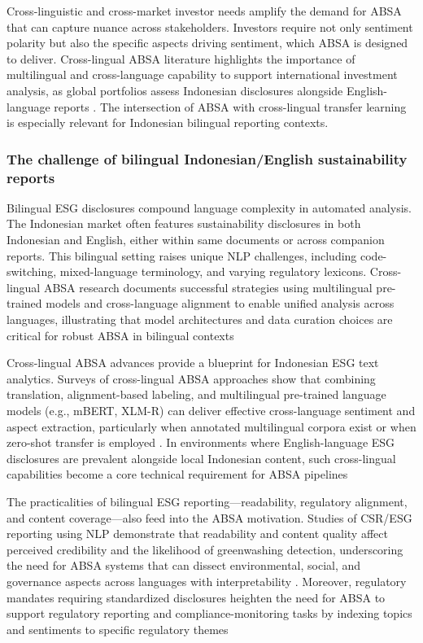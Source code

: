 Cross-linguistic and cross-market investor needs amplify the demand for ABSA that can capture nuance across stakeholders. Investors require not only sentiment polarity but also the specific aspects driving sentiment, which ABSA is designed to deliver. Cross-lingual ABSA literature highlights the importance of multilingual and cross-language capability to support international investment analysis, as global portfolios assess Indonesian disclosures alongside English-language reports \cite{10.1016/j.inffus.2025.103073,10.1111/eufm.12509,10.48550/arxiv.2511.00024}. The intersection of ABSA with cross-lingual transfer learning is especially relevant for Indonesian bilingual reporting contexts.

\subsubsection{The challenge of bilingual Indonesian/English sustainability reports}
Bilingual ESG disclosures compound language complexity in automated analysis. The Indonesian market often features sustainability disclosures in both Indonesian and English, either within same documents or across companion reports. This bilingual setting raises unique NLP challenges, including code-switching, mixed-language terminology, and varying regulatory lexicons. Cross-lingual ABSA research documents successful strategies using multilingual pre-trained models and cross-language alignment to enable unified analysis across languages, illustrating that model architectures and data curation choices are critical for robust ABSA in bilingual contexts \cite{10.1016/j.inffus.2025.103073,10.1111/eufm.12509,10.48550/arxiv.2511.00024}

Cross-lingual ABSA advances provide a blueprint for Indonesian ESG text analytics. Surveys of cross-lingual ABSA approaches show that combining translation, alignment-based labeling, and multilingual pre-trained language models (e.g., mBERT, XLM-R) can deliver effective cross-language sentiment and aspect extraction, particularly when annotated multilingual corpora exist or when zero-shot transfer is employed \cite{10.1016/j.inffus.2025.103073}. In environments where English-language ESG disclosures are prevalent alongside local Indonesian content, such cross-lingual capabilities become a core technical requirement for ABSA pipelines \cite{10.1016/j.inffus.2025.103073,10.1111/eufm.12509}

The practicalities of bilingual ESG reporting—readability, regulatory alignment, and content coverage—also feed into the ABSA motivation. Studies of CSR/ESG reporting using NLP demonstrate that readability and content quality affect perceived credibility and the likelihood of greenwashing detection, underscoring the need for ABSA systems that can dissect environmental, social, and governance aspects across languages with interpretability \cite{10.1111/eufm.12509}. Moreover, regulatory mandates requiring standardized disclosures heighten the need for ABSA to support regulatory reporting and compliance-monitoring tasks by indexing topics and sentiments to specific regulatory themes \cite{10.1007/s40804-021-00233-z,10.2139/ssrn.3738629}

